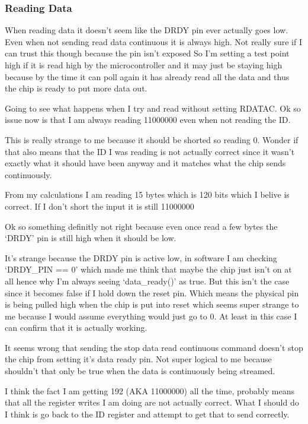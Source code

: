\subsubsection{Reading Data}
When reading data it doesn't seem like the DRDY pin ever actually goes low.
Even when not sending read data continuous it is always high.
Not really sure if I can trust this though because the pin isn't exposed
So I'm setting a test point high if it is read high by the microcontroller and it may
just be staying high because by the time it can poll again it has already read all the data
and thus the chip is ready to put more data out.

Going to see what happens when I try and read without setting RDATAC.
Ok so issue now is that I am always reading 11000000 even when not reading the ID.

This is really strange to me because it should be shorted so reading 0.
Wonder if that also means that the ID I was reading is not actually correct since it wasn't
exactly what it should have been anyway and it matches what the chip sends continuously.

From my calculations I am reading 15 bytes which is 120 bits which I belive is correct.
If I don't short the input it is still 11000000

Ok so something definitly not right because even once read a few bytes the `DRDY'
pin is still high when it should be low.

It's strange because the DRDY pin is active low, in software I am checking `DRDY\_PIN == 0'
which made me think that maybe the chip just isn't on at all hence why I'm always seeing
`data\_ready()' as true.
But this isn't the case since it becomes false if I hold down the reset pin.
Which means the physical pin is being pulled high when the chip is put into reset which
seems super strange to me because I would assume everything would just go to 0.
At least in this case I can confirm that it is actually working.

It seems wrong that sending the stop data read continuous command doesn't stop the chip
from setting it's data ready pin. Not super logical to me because shouldn't that only be
true when the data is continuously being streamed.

I think the fact I am getting 192 (AKA 11000000) all the time, probably means that all the
register writes I am doing are not actually correct. What I should do I think is go back
to the ID register and attempt to get that to send correctly.


